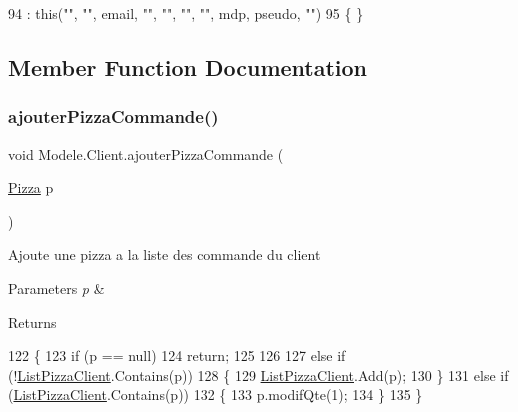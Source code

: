 \begin{DoxyCode}
94             : \textcolor{keyword}{this}(\textcolor{stringliteral}{""}, \textcolor{stringliteral}{""}, email, \textcolor{stringliteral}{""}, \textcolor{stringliteral}{""}, \textcolor{stringliteral}{""}, \textcolor{stringliteral}{""}, mdp, pseudo, \textcolor{stringliteral}{""})
95         \{ \}
\end{DoxyCode}


\subsection{Member Function Documentation}
\mbox{\label{classModele_1_1Client_a328e03bcb8a1b69483ae0fa2ee6e188e}} 
\subsubsection{\texorpdfstring{ajouter\+Pizza\+Commande()}{ajouterPizzaCommande()}}
{\footnotesize\ttfamily void Modele.\+Client.\+ajouter\+Pizza\+Commande (\begin{DoxyParamCaption}\item[{\hyperlink{classModele_1_1Pizza}{Pizza}}]{p }\end{DoxyParamCaption})\hspace{0.3cm}{\ttfamily [inline]}}



Ajoute une pizza a la liste des commande du client 


\begin{DoxyParams}{Parameters}
{\em p} & \\
\hline
\end{DoxyParams}
\begin{DoxyReturn}{Returns}

\end{DoxyReturn}

\begin{DoxyCode}
122         \{
123             \textcolor{keywordflow}{if} (p == null)
124                 \textcolor{keywordflow}{return};
125 
126             
127             \textcolor{keywordflow}{else} \textcolor{keywordflow}{if} (!\hyperlink{classModele_1_1Client_a14c37e4b9ab856a1e36b7c1610a0536c}{ListPizzaClient}.Contains(p))
128             \{
129                 \hyperlink{classModele_1_1Client_a14c37e4b9ab856a1e36b7c1610a0536c}{ListPizzaClient}.Add(p);
130             \}
131             \textcolor{keywordflow}{else} \textcolor{keywordflow}{if} (\hyperlink{classModele_1_1Client_a14c37e4b9ab856a1e36b7c1610a0536c}{ListPizzaClient}.Contains(p))
132             \{
133                 p.modifQte(1);
134             \}
135         \}
\end{DoxyCode}
\mbox{\label{classModele_1_1Client_a7c4008e301891dd0d1f9e00f44e7adea}} 
